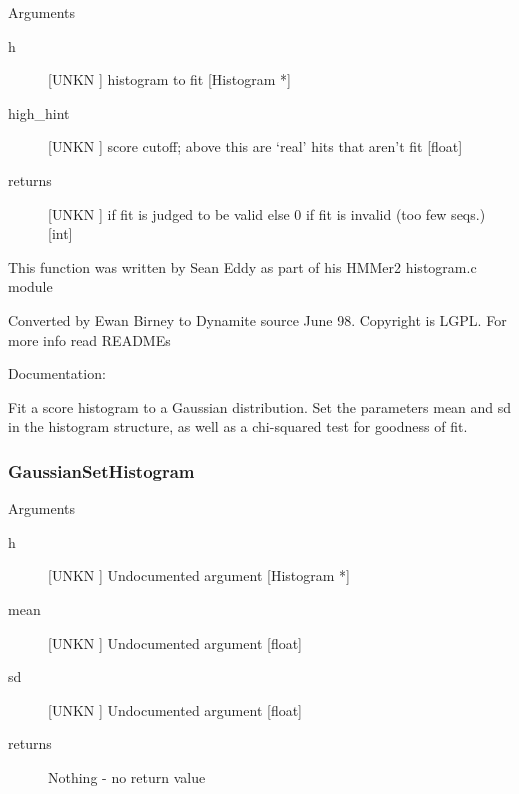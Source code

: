 Arguments
\begin{description}
\item[h] [UNKN ] histogram to fit [Histogram *]
\item[high_hint] [UNKN ] score cutoff; above this are `real' hits that aren't fit [float]
\item[returns] [UNKN ] if fit is judged to be valid else 0 if fit is invalid (too few seqs.)            [int]
\end{description}


This function was written by Sean Eddy
as part of his HMMer2 histogram.c module


Converted by Ewan Birney to Dynamite source June 98.
Copyright is LGPL. For more info read READMEs


Documentation:


Fit a score histogram to a Gaussian distribution.
Set the parameters mean and sd in the histogram
structure, as well as a chi-squared test for
goodness of fit.




\subsubsection{GaussianSetHistogram}

Arguments
\begin{description}
\item[h] [UNKN ] Undocumented argument [Histogram *]
\item[mean] [UNKN ] Undocumented argument [float]
\item[sd] [UNKN ] Undocumented argument [float]
\item[returns] Nothing - no return value
\end{description}


